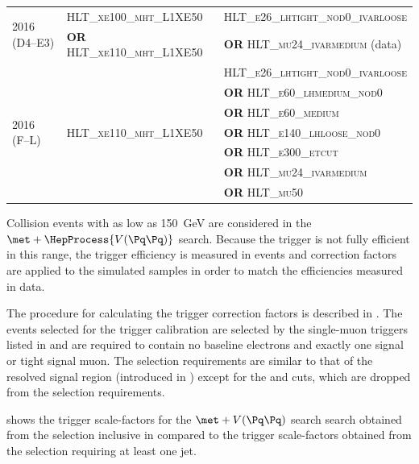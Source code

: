 \begin{table}[htbp]
{\begin{tabular}{l l l}
\midrule
\multirow{2}{*}{2016 (D4--E3)} & \textsc{HLT\_xe100\_mht\_L1XE50} & \textsc{HLT\_e26\_lhtight\_nod0\_ivarloose} \\
& \textbf{OR} \textsc{HLT\_xe110\_mht\_L1XE50} & \textbf{OR} \textsc{HLT\_mu24\_ivarmedium} (data) \\
\midrule
\multirow{7}{*}{2016 (F--L)} & \multirow{7}{*}{\textsc{HLT\_xe110\_mht\_L1XE50}} & \textsc{HLT\_e26\_lhtight\_nod0\_ivarloose} \\
& & \textbf{OR} \textsc{HLT\_e60\_lhmedium\_nod0} \\
& & \textbf{OR} \textsc{HLT\_e60\_medium} \\
& & \textbf{OR} \textsc{HLT\_e140\_lhloose\_nod0} \\
& & \textbf{OR} \textsc{HLT\_e300\_etcut} \\
& & \textbf{OR} \textsc{HLT\_mu24\_ivarmedium} \\
& & \textbf{OR} \textsc{HLT\_mu50} \\
\bottomrule
\end{tabular}%
}
\end{table}

Collision events with \met as low as \SI{150}{\giga\electronvolt} are considered in the \(\met + \HepProcess{V(\Pq\Pq)}\) search. Because the \met trigger is not fully efficient in this range, the trigger efficiency is measured in events and correction factors are applied to the simulated samples in order to match the efficiencies measured in data.

The procedure for calculating the \met trigger correction factors is described in .
The events selected for the \met trigger calibration are selected by the single-muon triggers listed in  and are required to contain no baseline electrons and exactly one signal or tight signal muon. The selection requirements are similar to that of the resolved signal region (introduced in ) except for the \metnolep and \mptnolep cuts, which are dropped from the selection requirements.

 shows the \met trigger scale-factors for the \(\met + V(\Pq\Pq)\) search search obtained from the selection inclusive in \bjets compared to the \met trigger scale-factors obtained from the selection requiring at least one \btagged jet.

